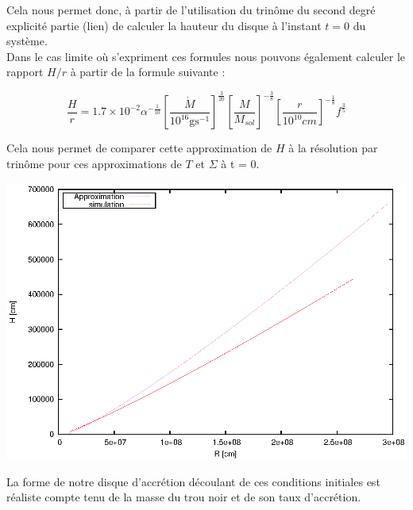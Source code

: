 Cela nous permet donc, à partir de l'utilisation du trinôme du second degré explicité partie (lien) de calculer la hauteur du disque à l'instant $t = 0$ du système. \\

Dans le cas limite où s'expriment ces formules nous pouvons également calculer le rapport $H/r$ à partir de la formule suivante : 

\begin{equation}
	\frac{H}{r} = 1.7 \times 10^{-2}\alpha^{- \frac{1}{10}} \left[ \frac{\dot{M}}{10^{16} \mbox{g} \mbox{s}^{-1}} \right]^{\frac{3}{20}} \left[ \frac{M}{M_{sol}}\right]^{- \frac{3}{8}} \left[ \frac{r}{10^{10} cm}\right]^{- \frac{1}{8}} f^{\frac{3}{5}}
\end{equation}
 
Cela nous permet de comparer cette approximation de $H$ à la résolution par trinôme pour ces approximations de $T$ et $\Sigma$ à t = 0. \\

\begin{center}
	\includegraphics[scale=0.8]{ic_h.eps}
\end{center} 

La forme de notre disque d'accrétion découlant de ces conditions initiales est réaliste compte tenu de la masse du trou noir et de son taux d'accrétion.
